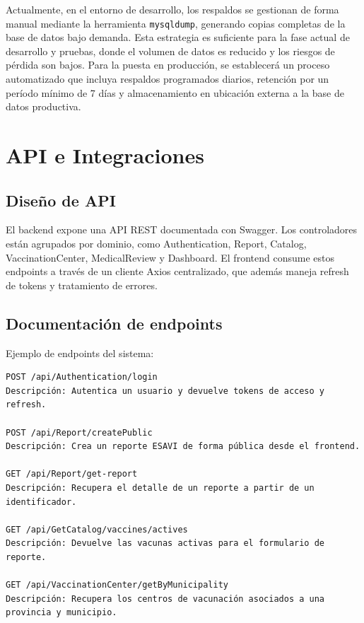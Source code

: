 \documentclass[12pt,letterpaper]{article}
\begin{document}
Actualmente, en el entorno de desarrollo, los respaldos se gestionan de forma manual mediante la herramienta \texttt{mysqldump}, generando copias completas de la base de datos bajo demanda. 
Esta estrategia es suficiente para la fase actual de desarrollo y pruebas, donde el volumen de datos es reducido y los riesgos de pérdida son bajos. 
Para la puesta en producción, se establecerá un proceso automatizado que incluya respaldos programados diarios, retención por un período mínimo de 7 días y almacenamiento en ubicación externa a la base de datos productiva.













\section{API e Integraciones}

\subsection{Diseño de API}

El backend expone una API REST documentada con Swagger. Los controladores están agrupados por dominio, como Authentication, Report, Catalog, VaccinationCenter, MedicalReview y Dashboard. El frontend consume estos endpoints a través de un cliente Axios centralizado, que además maneja refresh de tokens y tratamiento de errores.

\subsection{Documentación de endpoints}

Ejemplo de endpoints del sistema:

\begin{lstlisting}
POST /api/Authentication/login
Descripción: Autentica un usuario y devuelve tokens de acceso y refresh.

POST /api/Report/createPublic
Descripción: Crea un reporte ESAVI de forma pública desde el frontend.

GET /api/Report/get-report
Descripción: Recupera el detalle de un reporte a partir de un identificador.

GET /api/GetCatalog/vaccines/actives
Descripción: Devuelve las vacunas activas para el formulario de reporte.

GET /api/VaccinationCenter/getByMunicipality
Descripción: Recupera los centros de vacunación asociados a una provincia y municipio.
\end{lstlisting}
\end{document}
